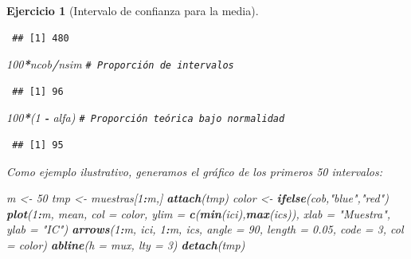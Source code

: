 \documentclass[
  spanish,
  10pt,
]{book}
\newenvironment{Shaded}{\begin{snugshade}}{\end{snugshade}}
\newcommand{\AttributeTok}[1]{\textcolor[rgb]{0.13,0.29,0.53}{#1}}
\newcommand{\CommentTok}[1]{\textcolor[rgb]{0.56,0.35,0.01}{\textit{#1}}}
\newcommand{\DecValTok}[1]{\textcolor[rgb]{0.00,0.00,0.81}{#1}}
\newcommand{\FloatTok}[1]{\textcolor[rgb]{0.00,0.00,0.81}{#1}}
\newcommand{\FunctionTok}[1]{\textcolor[rgb]{0.13,0.29,0.53}{\textbf{#1}}}
\newcommand{\NormalTok}[1]{#1}
\newcommand{\OtherTok}[1]{\textcolor[rgb]{0.56,0.35,0.01}{#1}}
\newcommand{\SpecialCharTok}[1]{\textcolor[rgb]{0.81,0.36,0.00}{\textbf{#1}}}
\newcommand{\StringTok}[1]{\textcolor[rgb]{0.31,0.60,0.02}{#1}}
\theoremstyle{break}
\newtheorem{exercise}{Ejercicio}[chapter]
\theoremstyle{nonumberplain}
\renewcommand{\CommentTok}[1]{\textcolor[rgb]{0.41,0.41,0.41}{\texttt{#1}}}
\begin{document}
\begin{exercise}[Intervalo de confianza para la media]
\begin{enumerate}
\begin{verbatim}
 ## [1] 480
\end{verbatim}

\begin{Shaded}
\begin{Highlighting}[]
\DecValTok{100}\SpecialCharTok{*}\NormalTok{ncob}\SpecialCharTok{/}\NormalTok{nsim     }\CommentTok{\# Proporción de intervalos}
\end{Highlighting}
\end{Shaded}

\begin{verbatim}
 ## [1] 96
\end{verbatim}

\begin{Shaded}
\begin{Highlighting}[]
\DecValTok{100}\SpecialCharTok{*}\NormalTok{(}\DecValTok{1} \SpecialCharTok{{-}}\NormalTok{ alfa)    }\CommentTok{\# Proporción teórica bajo normalidad}
\end{Highlighting}
\end{Shaded}

\begin{verbatim}
 ## [1] 95
\end{verbatim}

  Como ejemplo ilustrativo, generamos el gráfico de los primeros 50 intervalos:

\begin{Shaded}
\begin{Highlighting}[]
\NormalTok{m }\OtherTok{\textless{}{-}} \DecValTok{50}
\NormalTok{tmp }\OtherTok{\textless{}{-}}\NormalTok{ muestras[}\DecValTok{1}\SpecialCharTok{:}\NormalTok{m,]}
\FunctionTok{attach}\NormalTok{(tmp)}
\NormalTok{color }\OtherTok{\textless{}{-}} \FunctionTok{ifelse}\NormalTok{(cob,}\StringTok{"blue"}\NormalTok{,}\StringTok{"red"}\NormalTok{)}
\FunctionTok{plot}\NormalTok{(}\DecValTok{1}\SpecialCharTok{:}\NormalTok{m, mean, }\AttributeTok{col =}\NormalTok{ color, }\AttributeTok{ylim =} \FunctionTok{c}\NormalTok{(}\FunctionTok{min}\NormalTok{(ici),}\FunctionTok{max}\NormalTok{(ics)), }
     \AttributeTok{xlab =} \StringTok{"Muestra"}\NormalTok{, }\AttributeTok{ylab =} \StringTok{"IC"}\NormalTok{)}
\FunctionTok{arrows}\NormalTok{(}\DecValTok{1}\SpecialCharTok{:}\NormalTok{m, ici, }\DecValTok{1}\SpecialCharTok{:}\NormalTok{m, ics, }\AttributeTok{angle =} \DecValTok{90}\NormalTok{, }\AttributeTok{length =} \FloatTok{0.05}\NormalTok{, }\AttributeTok{code =} \DecValTok{3}\NormalTok{, }\AttributeTok{col =}\NormalTok{ color)}
\FunctionTok{abline}\NormalTok{(}\AttributeTok{h =}\NormalTok{ mux, }\AttributeTok{lty =} \DecValTok{3}\NormalTok{)}
\FunctionTok{detach}\NormalTok{(tmp)}
\end{Highlighting}
\end{Shaded}


\end{enumerate}
\end{exercise}
\end{document}
